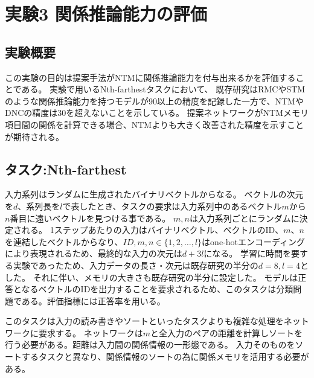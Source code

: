 \section{実験3 関係推論能力の評価}
\subsection{実験概要}
この実験の目的は提案手法がNTMに関係推論能力を付与出来るかを評価することである。
実験で用いるNth-farthestタスクにおいて、
既存研究\cite{rrnn}\cite{sam}はRMCやSTMのような関係推論能力を持つモデルが90以上の精度を記録した一方で、NTMやDNCの精度は30を超えないことを示している。
提案ネットワークがNTMメモリ項目間の関係を計算できる場合、NTMよりも大きく改善された精度を示すことが期待される。

\subsection{タスク:Nth-farthest}
入力系列はランダムに生成されたバイナリベクトルからなる。
ベクトルの次元を$d$、系列長を$l$で表したとき、タスクの要求は入力系列中のあるベクトル$m$から$n$番目に遠いベクトルを見つける事である。
$m,n$は入力系列ごとにランダムに決定される。
1ステップあたりの入力はバイナリベクトル、ベクトルのID、$m$、$n$を連結したベクトルからなり、$ID,m,n∈\{1,2,…,l\}$はone-hotエンコーディングにより表現されるため、最終的な入力の次元は$d+3l$になる。
学習に時間を要する実験であったため、入力データの長さ・次元は既存研究\cite{rrnn}の半分の$d=8,l=4$とした。
それに伴い、メモリの大きさも既存研究の半分に設定した。
モデルは正答となるベクトルのIDを出力することを要求されるため、このタスクは分類問題である。評価指標には正答率を用いる。

このタスクは入力の読み書きやソートといったタスクよりも複雑な処理をネットワークに要求する。
ネットワークは$m$と全入力のペアの距離を計算しソートを行う必要がある。距離は入力間の関係情報の一形態である。
入力そのものをソートするタスクと異なり、関係情報のソートの為に関係メモリを活用する必要がある。

